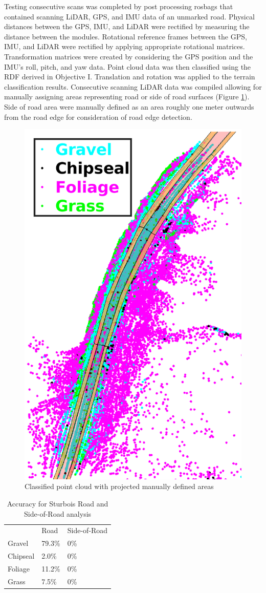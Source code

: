 \documentclass[journal,onecolumn]{IEEEtran}
\begin{document}
{	Testing consecutive scans was completed by post processing rosbags that contained scanning LiDAR, GPS, and IMU data of an unmarked road. Physical distances between the GPS, IMU, and LiDAR were rectified by measuring the distance between the modules. Rotational reference frames between the GPS, IMU, and LiDAR were rectified by applying appropriate rotational matrices. Transformation matrices were created by considering the GPS position and the IMU's roll, pitch, and yaw data. Point cloud data was then classified using the RDF derived in Objective I. Translation and rotation was applied to the terrain classification results. Consecutive scanning LiDAR data was compiled allowing for manually assigning areas representing road or side of road surfaces (Figure \ref{fig:Classified_PointCloud_1_ALL}). Side of road area were manually defined as an area roughly one meter outwards from the road edge for consideration of road edge detection. 
	
	\begin{figure}[H]
		\centering
		\includegraphics[width=0.45\linewidth]{figures/both_classification_things_sturbois_curve_1}
		\caption{Classified point cloud with projected manually defined areas}
		\label{fig:Classified_PointCloud_1_ALL}
	\end{figure}
	
	\begin{table}
		\centering
		\begin{tabular}{lll}
			& Road 		& Side-of-Road 	\\
			Gravel   	& 79.3\% 	& 0\%			\\
			Chipseal 	& 2.0\% 	& 0\%  			\\
			Foliage  	& 11.2\% 	& 0\% 			\\
			Grass    	& 7.5\% 	& 0\%
		\end{tabular}
		\caption[Sturbois Road Curve Example 1]{Accuracy for Sturbois Road and Side-of-Road analysis}
		\label{tab:Sturbois_Curve_1_Road_Results}
	\end{table}

}
\end{document}
